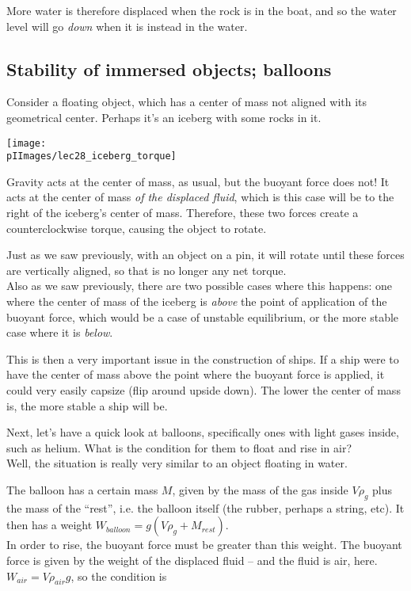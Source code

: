 More water is therefore displaced when the rock is in the boat, and so the water level will go \emph{down} when it is instead in the water.

\subsection{Stability of immersed objects; balloons}

Consider a floating object, which has a center of mass not aligned with its geometrical center. Perhaps it's an iceberg with some rocks in it.

\begin{center}
\texttt{[image: \\pIImages/lec28\_iceberg\_torque]}
\end{center}

Gravity acts at the center of mass, as usual, but the buoyant force does not! It acts at the center of mass \emph{of the displaced fluid}, which is this case will be to the right of the iceberg's center of mass. Therefore, these two forces create a counterclockwise torque, causing the object to rotate.

Just as we saw previously, with an object on a pin, it will rotate until these forces are vertically aligned, so that is no longer any net torque.\\
Also as we saw previously, there are two possible cases where this happens: one where the center of mass of the iceberg is \emph{above} the point of application of the buoyant force, which would be a case of unstable equilibrium, or the more stable case where it is \emph{below}.

This is then a very important issue in the construction of ships. If a ship were to have the center of mass above the point where the buoyant force is applied, it could very easily capsize (flip around upside down). The lower the center of mass is, the more stable a ship will be.

Next, let's have a quick look at balloons, specifically ones with light gases inside, such as helium. What is the condition for them to float and rise in air?\\
Well, the situation is really very similar to an object floating in water.

The balloon has a certain mass $M$, given by the mass of the gas inside $V \rho_g$ plus the mass of the ``rest'', i.e. the balloon itself (the rubber, perhaps a string, etc). It then has a weight $W_{balloon} = g(V \rho_g + M_{rest})$.\\
In order to rise, the buoyant force must be greater than this weight. The buoyant force is given by the weight of the displaced fluid -- and the fluid is air, here. $W_{air} = V \rho_{air} g$, so the condition is

